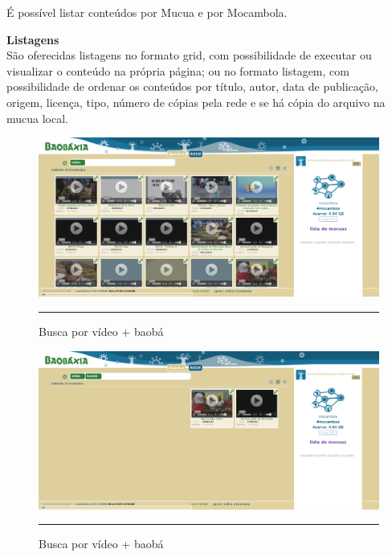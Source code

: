 É possível listar conteúdos por Mucua e por Mocambola.

\textbf{Listagens}\\

São oferecidas listagens no formato grid, com possibilidade de executar ou
visualizar o conteúdo na própria página; ou no formato listagem, com possibilidade
de ordenar os conteúdos por título, autor, data de publicação, origem, licença, tipo,
número de cópias pela rede e se há cópia do arquivo na mucua local.

\begin{figure}[htbp]
  \centering
  \includegraphics[width=\textwidth]{./Fig/InterfaceBaobaxia-busca-video.pdf}
  \rule{35em}{0.5pt}
  \caption[Busca por vídeo + baobá]{Busca por vídeo + baobá}
  \label{fig:InterfaceBaobaxia-busca-video}
\end{figure}

\begin{figure}[htbp]
  \centering
  \includegraphics[width=\textwidth]{./Fig/InterfaceBaobaxia-busca-video-baoba.pdf}
  \rule{35em}{0.5pt}
  \caption[Busca por vídeo + baobá]{Busca por vídeo + baobá}
  \label{fig:InterfaceBaobaxia-busca-video-baoba}
\end{figure}

